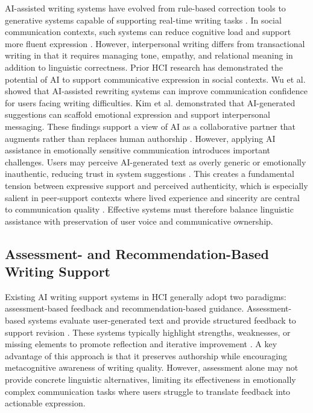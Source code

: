 \documentclass[]{llncs}
\begin{document}
AI-assisted writing systems have evolved from rule-based correction tools to generative systems capable of supporting real-time writing tasks \cite{Jakesch2023a,Weisz2023}. In social communication contexts, such systems can reduce cognitive load and support more fluent expression \cite{Hui2018,Gero2019}. However, interpersonal writing differs from transactional writing in that it requires managing tone, empathy, and relational meaning in addition to linguistic correctness. Prior HCI research has demonstrated the potential of AI to support communicative expression in social contexts. Wu et al. \cite{Wu2019} showed that AI-assisted rewriting systems can improve communication confidence for users facing writing difficulties. Kim et al. \cite{Kim2019} demonstrated that AI-generated suggestions can scaffold emotional expression and support interpersonal messaging. These findings support a view of AI as a collaborative partner that augments rather than replaces human authorship \cite{Jakesch2019}. However, applying AI assistance in emotionally sensitive communication introduces important challenges. Users may perceive AI-generated text as overly generic or emotionally inauthentic, reducing trust in system suggestions \cite{Jakesch2019,Jakesch2023b}. This creates a fundamental tension between expressive support and perceived authenticity, which is especially salient in peer-support contexts where lived experience and sincerity are central to communication quality \cite{Shen2024}. Effective systems must therefore balance linguistic assistance with preservation of user voice and communicative ownership.

\subsection{Assessment- and Recommendation-Based Writing Support}

Existing AI writing support systems in HCI generally adopt two paradigms: assessment-based feedback and recommendation-based guidance. Assessment-based systems evaluate user-generated text and provide structured feedback to support revision \cite{Hattie2007}. These systems typically highlight strengths, weaknesses, or missing elements to promote reflection and iterative improvement \cite{Wang2018,Kelly2018}. A key advantage of this approach is that it preserves authorship while encouraging metacognitive awareness of writing quality. However, assessment alone may not provide concrete linguistic alternatives, limiting its effectiveness in emotionally complex communication tasks where users struggle to translate feedback into actionable expression.
\end{document}
